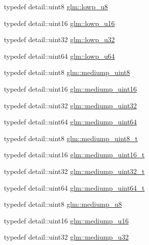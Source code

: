 \begin{DoxyCompactItemize}
\item 
typedef detail\+::uint8 \hyperlink{group__gtc__type__precision_gae63f942c49a30dbf266b2f13f3efe257}{glm\+::lowp\+\_\+u8}
\item 
typedef detail\+::uint16 \hyperlink{group__gtc__type__precision_ga22c5364f27caa0a6eb0627cbc21e46be}{glm\+::lowp\+\_\+u16}
\item 
typedef detail\+::uint32 \hyperlink{group__gtc__type__precision_gaba06fae1dd98ca50c017e68345df0365}{glm\+::lowp\+\_\+u32}
\item 
typedef detail\+::uint64 \hyperlink{group__gtc__type__precision_ga61ed4c68a4cffb77cd63cc107119123a}{glm\+::lowp\+\_\+u64}
\item 
typedef detail\+::uint8 \hyperlink{group__gtc__type__precision_gac4b849eaac0543a10f97f4bdda4850a8}{glm\+::mediump\+\_\+uint8}
\item 
typedef detail\+::uint16 \hyperlink{group__gtc__type__precision_ga2cef3a0d7b0fce75c9885f64656d8933}{glm\+::mediump\+\_\+uint16}
\item 
typedef detail\+::uint32 \hyperlink{group__gtc__type__precision_ga861dbd1051f488e425b3966001b568e5}{glm\+::mediump\+\_\+uint32}
\item 
typedef detail\+::uint64 \hyperlink{group__gtc__type__precision_ga6685788d15d0a973ee7c2460d0456dc1}{glm\+::mediump\+\_\+uint64}
\item 
typedef detail\+::uint8 \hyperlink{group__gtc__type__precision_gadfa38f3c245d371c4b2079f1fd68928b}{glm\+::mediump\+\_\+uint8\+\_\+t}
\item 
typedef detail\+::uint16 \hyperlink{group__gtc__type__precision_ga0b385466deac5ac96061ef2cdd6db20f}{glm\+::mediump\+\_\+uint16\+\_\+t}
\item 
typedef detail\+::uint32 \hyperlink{group__gtc__type__precision_gac7782c1e393f9ad47e41a177a685f287}{glm\+::mediump\+\_\+uint32\+\_\+t}
\item 
typedef detail\+::uint64 \hyperlink{group__gtc__type__precision_gaa97354d3120a6dc029a5e9563723de18}{glm\+::mediump\+\_\+uint64\+\_\+t}
\item 
typedef detail\+::uint8 \hyperlink{group__gtc__type__precision_gac04b372784392e82bd557f300c4de097}{glm\+::mediump\+\_\+u8}
\item 
typedef detail\+::uint16 \hyperlink{group__gtc__type__precision_ga6745262ef6a6fdb8637b2387ef924828}{glm\+::mediump\+\_\+u16}
\item 
typedef detail\+::uint32 \hyperlink{group__gtc__type__precision_gad0c27a525045c299a92306eb4cd7c13a}{glm\+::mediump\+\_\+u32}

\end{DoxyCompactItemize}
